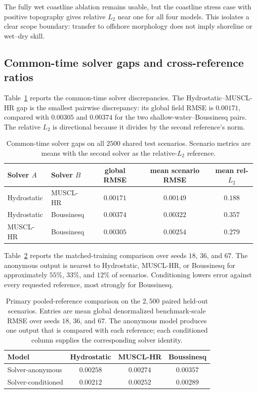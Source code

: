 The fully wet coastline ablation remains usable, but the coastline stress case with positive topography gives relative $L_2$ near one for all four models. This isolates a clear scope boundary: transfer to offshore morphology does not imply shoreline or wet--dry skill.

\FloatBarrier
\subsection{Common-time solver gaps and cross-reference ratios}
\label{subsec:res-solver-fidelity}

Table~\ref{tab:solvergap} reports the common-time solver discrepancies. The Hydrostatic--MUSCL-HR gap is the smallest pairwise discrepancy: its global field RMSE is $0.00171$, compared with $0.00305$ and $0.00374$ for the two shallow-water--Boussinesq pairs. The relative $L_2$ is directional because it divides by the second reference's norm.

\begin{table}[pos=!htbp]
\centering
\caption{Common-time solver gaps on all $2500$ shared test scenarios. Scenario metrics are means with the second solver as the relative-$L_2$ reference.}
\label{tab:solvergap}
\begin{tabular}{llccc}
    \toprule
    Solver $A$ & Solver $B$ & global RMSE & mean scenario RMSE & mean rel-$L_2$ \\
    \midrule
    Hydrostatic & MUSCL-HR   & $0.00171$ & $0.00149$ & $0.188$ \\
    Hydrostatic & Boussinesq & $0.00374$ & $0.00322$ & $0.357$ \\
    MUSCL-HR    & Boussinesq & $0.00305$ & $0.00254$ & $0.279$ \\
    \bottomrule
\end{tabular}
\end{table}

Table~\ref{tab:pooled-reference} reports the matched-training comparison over seeds $18$, $36$, and $67$. The anonymous output is nearest to Hydrostatic, MUSCL-HR, or Boussinesq for approximately $55\%$, $33\%$, and $12\%$ of scenarios. Conditioning lowers error against every requested reference, most strongly for Boussinesq.

\begin{table}[pos=!htbp]
\centering
\caption{Primary pooled-reference comparison on the $2{,}500$ paired held-out scenarios. Entries are mean global denormalized benchmark-scale RMSE over seeds $18$, $36$, and $67$. The anonymous model produces one output that is compared with each reference; each conditioned column supplies the corresponding solver identity.}
\label{tab:pooled-reference}
\small
\begin{tabular}{lccc}
    \toprule
    Model & Hydrostatic & MUSCL-HR & Boussinesq \\
    \midrule
    Solver-anonymous   & $0.00258$ & $0.00274$ & $0.00357$ \\
    Solver-conditioned & $0.00212$ & $0.00252$ & $0.00289$ \\
    \bottomrule
\end{tabular}
\end{table}

